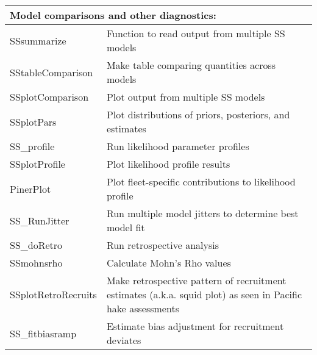 \begin{center}
\begin{longtable}{p{4.5cm} p{10.52cm}}
		\multicolumn{2}{l}{Model comparisons and other diagnostics:} \Tstrut\Bstrut\\
		\hline
		SSsummarize   \Tstrut & Function to read output from multiple SS models\\
		SStableComparison \Tstrut & Make table comparing quantities across models\\
		SSplotComparison \Tstrut & Plot output from multiple SS models \\
		SSplotPars    \Tstrut & Plot distributions of priors, posteriors, and estimates \\
		SS\_profile \Tstrut & Run likelihood parameter profiles \\
		SSplotProfile \Tstrut & Plot likelihood profile results \\
		PinerPlot     \Tstrut & Plot fleet-specific contributions to likelihood profile \\
		SS\_RunJitter \Tstrut & Run multiple model jitters to determine best model fit \\
		SS\_doRetro \Tstrut & Run retrospective analysis \\
		SSmohnsrho \Tstrut & Calculate Mohn's Rho values\\
		SSplotRetroRecruits \Tstrut & Make retrospective pattern of recruitment estimates (a.k.a. squid plot) as seen in Pacific hake assessments\Bstrut \\
		SS\_fitbiasramp \Tstrut& Estimate bias adjustment for recruitment deviates \Bstrut\\
		\hline
		

\end{longtable}
\end{center}
